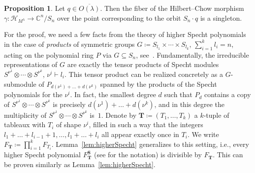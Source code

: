 \documentclass[11pt]{amsart}
\theoremstyle{definition}
\newtheorem{proposition}[theorem]{Proposition}
\newcommand{\CC}{\mathbb{C}}
\newcommand{\HH}{\mathcal{H}}
\begin{document}
\begin{proposition}\label{prop:HilbChowInjective}
    Let $q \in \overline{O(\lambda)}$. Then the fiber of the Hilbert--Chow morphism $\gamma \colon \HH_{M^\lambda} \longrightarrow \CC^n/S_n$ over the point corresponding to the orbit ${S_n \cdot q}$ is a singleton.
\end{proposition}

For the proof, we need a few facts from the theory of higher Specht polynomials in the case of \emph{products} of symmetric groups $G \coloneqq S_{l_1} \times \cdots \times S_{l_k}$, $\sum_{i=1}^k l_i = n$, acting on the polynomial ring $P$ via $G \subseteq S_n$, see~\cite{Ariki1997Higher}. Fundamentally, the irreducible representations of $G$ are exactly the tensor products of Specht modules \mbox{$S^{\nu^1} \otimes \cdots \otimes S^{\nu^k}$}, $\nu^i \vdash l_i$. This tensor product can be realized concretely as a $G$-submodule of $P_{d(\nu^1) + \ldots + d(\nu^k)}$ spanned by the products of the Specht polynomials for the $\nu^i$. In fact, the smallest degree $d$ such that $P_d$ contains a copy of \mbox{$S^{\nu^1} \otimes \cdots \otimes S^{\nu^k}$} is precisely $d(\nu^1) + \ldots + d(\nu^k)$, and in this degree the multiplicity of \mbox{$S^{\nu^1} \otimes \cdots \otimes S^{\nu^k}$} is~$1$. Denote by $\mathbf{T} \coloneqq (T_1, \ldots, T_k)$ a $k$-tuple of tableaux with $T_i$ of shape $\nu^i$, filled in such a way that the integers $l_1 + \ldots + l_{i-1} + 1, \ldots, l_1 + \ldots + l_i$ all appear exactly once in $T_i$. We write $F_{\mathbf{T}} \coloneqq \prod_{i=1}^k F_{T_i}$. Lemma~\ref{lem:higherSpecht} generalizes to this setting, i.e., every higher Specht polynomial $F_{\mathbf{T}}^{\mathbf{S}}$ (see \cite{Ariki1997Higher} for the notation) is divisible by $F_{\mathbf{T}}$. This can be proven similarly as Lemma~\ref{lem:higherSpecht}.
\end{document}

